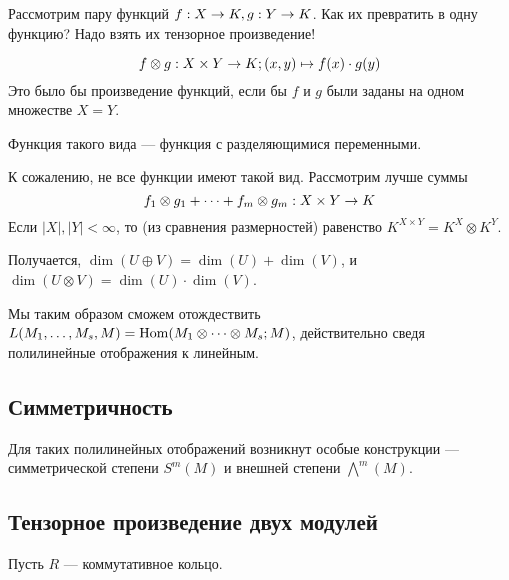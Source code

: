 Рассмотрим пару функций $f: X \rightarrow K, g: Y \rightarrow K$.
Как их превратить в одну функцию?
Надо взять их тензорное произведение!

\[f\otimes g: X \times Y \rightarrow K; (x, y) \mapsto f(x) \cdot g(y)\]
Это было бы произведение функций, если бы $f$ и $g$ были заданы на одном множестве $X = Y$.

Функция такого вида --- функция с разделяющимися переменными.

К сожалению, не все функции имеют такой вид.
Рассмотрим лучше суммы
\[f_1 \otimes g_1 + \dots + f_m \otimes g_m: X \times Y \rightarrow K\]
Если $|X|, |Y| < \infty$, то (из сравнения размерностей) равенство $K^{X \times Y} = K^X \otimes K^Y$.

Получается, $\dim(U \oplus V) = \dim(U) + \dim(V)$, и $\dim(U \otimes V) = \dim(U) \cdot \dim(V)$.

Мы таким образом сможем отождествить $L(M_1, \dots, M_s, M) = \operatorname{Hom}(M_1 \otimes \dots \otimes M_s; M)$, действительно сведя полилинейные отображения к линейным.

\subsection{Симметричность}
Для таких полилинейных отображений возникнут особые конструкции --- симметрической степени $S^m(M)$ и внешней степени $\bigwedge^m(M)$.

\subsection{Тензорное произведение двух модулей}
Пусть $R$ --- коммутативное кольцо.

